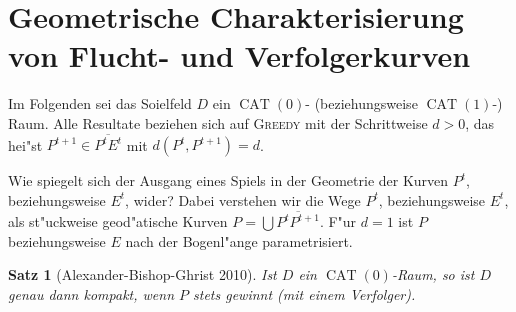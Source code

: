 \documentclass[paper=A4, twoside, chapterprefix=true, bibliography=totoc, headsepline]{scrbook}
\newcommand{\tikzgitter}[3][0.25]{ %
	\draw[step=#1,gray!15] #2 grid #3;
	\draw[step=2*#1,gray!30] #2 grid #3;
	\fill (0,0) circle(0.1); 
}
\DeclareMathOperator{\CAT}{CAT}
\newcommand{\kapit}[1]{\textsc{#1}\xspace} %
\newcommand{\Greedy}{\kapit{Greedy}}
\theoremstyle{break}
\theoremstyle{nonumberbreak}
\newtheorem{satz}{Satz}
\theoremstyle{emptybreak}
\theoremstyle{break}
\begin{document}

\section{Geometrische Charakterisierung von Flucht- und Verfolgerkurven}

Im Folgenden sei das Soielfeld $D$ ein $\CAT(0)$- (beziehungsweise $\CAT(1)$-) Raum.
Alle Resultate beziehen sich auf \Greedy mit der Schrittweise $d > 0$, das hei"st $P^{t+1} \in \overline{P^t E^t}$ mit $d(P^t, P^{t+1}) = d$.
\begin{center}\end{center}
Wie spiegelt sich der Ausgang eines Spiels in der Geometrie der Kurven $P^t$, beziehungsweise $E^t$, wider?
Dabei verstehen wir die Wege $P^t$, beziehungsweise $E^t$, als st"uckweise geod"atische Kurven $P = \bigcup \overline{P^t P^{t+1}}$.
F"ur $d = 1$ ist $P$ beziehungsweise $E$ nach der Bogenl"ange parametrisiert.

\begin{satz}[Alexander-Bishop-Ghrist 2010]
Ist $D$ ein $\CAT(0)$-Raum, so ist $D$ genau dann kompakt, wenn $P$ stets gewinnt (mit einem Verfolger).
\end{satz}
\end{document}
